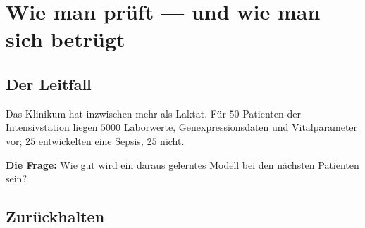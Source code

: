\chapter{Wie man prüft --- und wie man sich betrügt}

\section{Der Leitfall}

\begin{merksatz}
Das Klinikum hat inzwischen mehr als Laktat. Für $50$ Patienten der Intensivstation liegen $5000$ Laborwerte, Genexpressionsdaten und Vitalparameter vor; $25$ entwickelten eine Sepsis, $25$ nicht.

\begin{center}
\begin{minipage}{0.9\textwidth}
\textbf{Die Frage:} Wie gut wird ein daraus gelerntes Modell bei den nächsten Patienten sein?
\end{minipage}
\end{center}

\begin{center}
\begin{minipage}{0.88\textwidth}
\end{minipage}
\end{center}
\end{merksatz}

\section{Zurückhalten}

